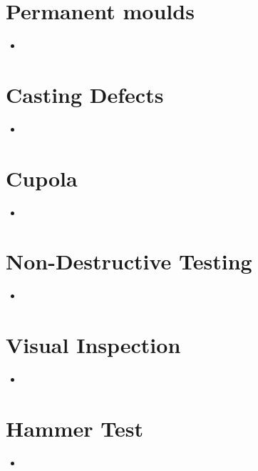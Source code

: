 \documentclass[8pt]{report}
\begin{document}
\section{Permanent moulds}
	\begin{itemize}
		\item
	\end{itemize}\hrulefill
\section{Casting Defects}
	\begin{itemize}
		\item
	\end{itemize}\hrulefill
\section{Cupola}
	\begin{itemize}
		\item
	\end{itemize}\hrulefill
\section{Non-Destructive Testing}
	\begin{itemize}
		\item
	\end{itemize}\hrulefill
\section{Visual Inspection}
	\begin{itemize}
		\item
	\end{itemize}\hrulefill
\section{Hammer Test}
	\begin{itemize}
		\item
	\end{itemize}\hrulefill
\end{document}
